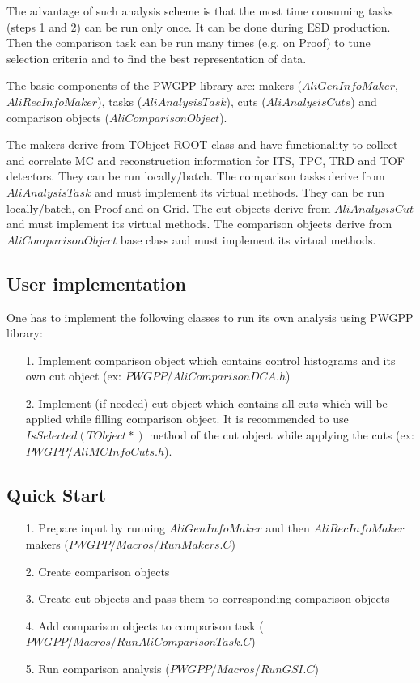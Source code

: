 \documentclass{elsart}
\begin{document}
The advantage of such analysis scheme is that the most time consuming
tasks (steps 1 and 2) can be run only once. It can be done during
ESD production. Then the comparison task can be run many times (e.g. on Proof) 
to tune selection criteria and to find the best representation of data. 

The basic components of the PWGPP library are: makers ($AliGenInfoMaker$, $AliRecInfoMaker$), 
tasks ($AliAnalysisTask$), cuts ($AliAnalysisCuts$) and comparison objects ($AliComparisonObject$). 

The makers derive from TObject ROOT class and have functionality to collect and correlate MC and reconstruction 
information for ITS, TPC, TRD and TOF detectors. They can be run locally/batch. The comparison tasks derive from $AliAnalysisTask$ and must implement its virtual methods. They can be run locally/batch, on Proof and on Grid. The cut objects derive from $AliAnalysisCut$ and must implement its virtual methods. The comparison objects derive from $AliComparisonObject$ base class and must implement its virtual methods.

\subsection{User implementation}

One has to implement the following classes to run its own analysis using PWGPP library:

\begin{itemize}
\item[1.] Implement comparison object which contains control histograms and its own cut object (ex: $PWGPP/AliComparisonDCA.h$) 
\item[2.] Implement (if needed) cut object which contains all cuts which will be applied while filling comparison object. It is recommended to use $IsSelected(TObject*)$ method of the cut object while applying the cuts (ex: $PWGPP/AliMCInfoCuts.h$).
\end{itemize}
 
\subsection{Quick Start}
 
\begin{itemize}
\item[1.] Prepare input by running $AliGenInfoMaker$ and then $AliRecInfoMaker$ makers ($PWGPP/Macros/RunMakers.C$)
\item[2.] Create comparison objects 
\item[3.] Create cut objects and pass them to corresponding comparison objects
\item[4.] Add comparison objects to comparison task \newline ($PWGPP/Macros/RunAliComparisonTask.C$)
\item[5.] Run comparison analysis ($PWGPP/Macros/RunGSI.C$)

\end{itemize}
 
\end{document}
